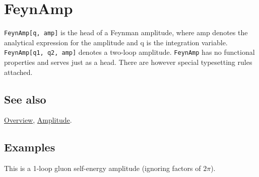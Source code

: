 \documentclass[../FeynCalcManual.tex]{subfiles}
\begin{document}
\hypertarget{feynamp}{
\section{FeynAmp}\label{feynamp}}

\texttt{FeynAmp[\allowbreak{}q,\ \allowbreak{}amp]} is the head of a
Feynman amplitude, where amp denotes the analytical expression for the
amplitude and q is the integration variable.
\texttt{FeynAmp[\allowbreak{}q1,\ \allowbreak{}q2,\ \allowbreak{}amp]}
denotes a two-loop amplitude. \texttt{FeynAmp} has no functional
properties and serves just as a head. There are however special
typesetting rules attached.

\subsection{See also}

\hyperlink{toc}{Overview}, \hyperlink{amplitude}{Amplitude}.

\subsection{Examples}

This is a 1-loop gluon self-energy amplitude (ignoring factors of
\(2 \pi\)).

\begin{Shaded}
\begin{Highlighting}[]
\OperatorTok{[}\OperatorTok{,}\OperatorTok{[}\OperatorTok{,} \SpecialCharTok{\textbackslash{}}\OperatorTok{[}\OperatorTok{],} \OperatorTok{,}  \SpecialCharTok{{-}} \OperatorTok{,} \SpecialCharTok{\textbackslash{}}\OperatorTok{[}\OperatorTok{],} \OperatorTok{,} \SpecialCharTok{{-}}\OperatorTok{,} \SpecialCharTok{\textbackslash{}}\OperatorTok{[}\OperatorTok{],} \OperatorTok{]}\OperatorTok{[} \SpecialCharTok{{-}} \OperatorTok{,} \SpecialCharTok{\textbackslash{}}\OperatorTok{[}\OperatorTok{],} \OperatorTok{,} \SpecialCharTok{\textbackslash{}}\OperatorTok{[}\OperatorTok{],} \OperatorTok{]}\OperatorTok{[}\SpecialCharTok{{-}}\OperatorTok{,} \SpecialCharTok{\textbackslash{}}\OperatorTok{[}\OperatorTok{],} \OperatorTok{,}  \SpecialCharTok{{-}} \OperatorTok{,} \SpecialCharTok{\textbackslash{}}\OperatorTok{[}\OperatorTok{],} \OperatorTok{,} \OperatorTok{,} \SpecialCharTok{\textbackslash{}}\OperatorTok{[}\OperatorTok{],} \OperatorTok{]} \SpecialCharTok{*}
\OperatorTok{[}\OperatorTok{,} \SpecialCharTok{\textbackslash{}}\OperatorTok{[}\OperatorTok{],} \OperatorTok{,} \SpecialCharTok{\textbackslash{}}\OperatorTok{[}\OperatorTok{],} \OperatorTok{]]}
\end{Highlighting}
\end{Shaded}
\end{document}
